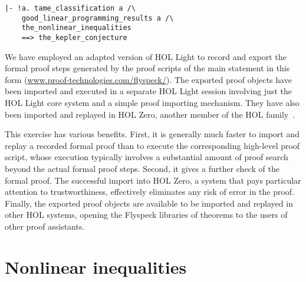 \begin{obeylines}

\begin{Verbatim}[fontsize=\small]
|- !a. tame_classification a /\
    good_linear_programming_results a /\ 
    the_nonlinear_inequalities
    ==> the_kepler_conjecture
\end{Verbatim}

\end{obeylines}

We have employed an adapted version of HOL Light to record and export
the formal proof steps generated by the proof scripts of the main
statement in this form (\url{www.proof-technologies.com/flyspeck/}).
The exported proof objects have been imported and executed in a
separate HOL Light session involving just the HOL Light core system
and a simple proof importing mechanism.  They have also been imported
and replayed in HOL Zero, another member of the HOL
family~\cite{adams2010introducing}.  


This exercise has various benefits.  First, it is generally much
faster to import and replay a recorded formal proof than to execute
the corresponding high-level proof script, whose execution typically
involves a substantial amount of proof search beyond the actual formal
proof steps. Second, it gives a further check of the formal proof.
The successful import into HOL
Zero, a system that pays particular attention to trustworthiness,
effectively eliminates any risk of error in the proof.
Finally, the exported proof objects are available to be imported and
replayed in other HOL systems, opening the Flyspeck libraries of
theorems to the users of other proof assistants.  



\section{Nonlinear inequalities}\label{sec:ni}


